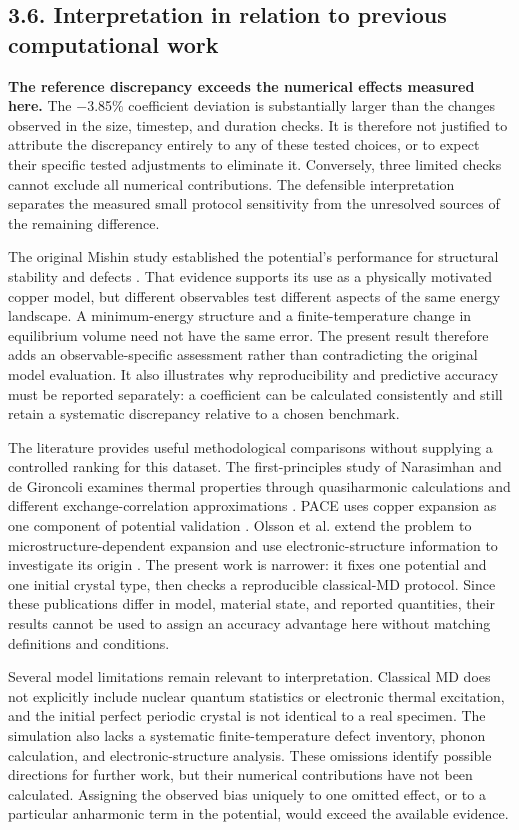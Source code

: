 \documentclass[10pt,a4paper,twocolumn]{article}
\begin{document}
\subsection*{3.6. Interpretation in relation to previous computational work}

\textbf{The reference discrepancy exceeds the numerical effects measured here.} The −3.85\% coefficient deviation is substantially larger than the changes observed in the size, timestep, and duration checks. It is therefore not justified to attribute the discrepancy entirely to any of these tested choices, or to expect their specific tested adjustments to eliminate it. Conversely, three limited checks cannot exclude all numerical contributions. The defensible interpretation separates the measured small protocol sensitivity from the unresolved sources of the remaining difference.


The original Mishin study established the potential's performance for structural stability and defects \cite{r5}. That evidence supports its use as a physically motivated copper model, but different observables test different aspects of the same energy landscape. A minimum-energy structure and a finite-temperature change in equilibrium volume need not have the same error. The present result therefore adds an observable-specific assessment rather than contradicting the original model evaluation. It also illustrates why reproducibility and predictive accuracy must be reported separately: a coefficient can be calculated consistently and still retain a systematic discrepancy relative to a chosen benchmark.


The literature provides useful methodological comparisons without supplying a controlled ranking for this dataset. The first-principles study of Narasimhan and de Gironcoli examines thermal properties through quasiharmonic calculations and different exchange-correlation approximations \cite{r2}. PACE uses copper expansion as one component of potential validation \cite{r3}. Olsson et al. extend the problem to microstructure-dependent expansion and use electronic-structure information to investigate its origin \cite{r4}. The present work is narrower: it fixes one potential and one initial crystal type, then checks a reproducible classical-MD protocol. Since these publications differ in model, material state, and reported quantities, their results cannot be used to assign an accuracy advantage here without matching definitions and conditions.


Several model limitations remain relevant to interpretation. Classical MD does not explicitly include nuclear quantum statistics or electronic thermal excitation, and the initial perfect periodic crystal is not identical to a real specimen. The simulation also lacks a systematic finite-temperature defect inventory, phonon calculation, and electronic-structure analysis. These omissions identify possible directions for further work, but their numerical contributions have not been calculated. Assigning the observed bias uniquely to one omitted effect, or to a particular anharmonic term in the potential, would exceed the available evidence.
\end{document}
